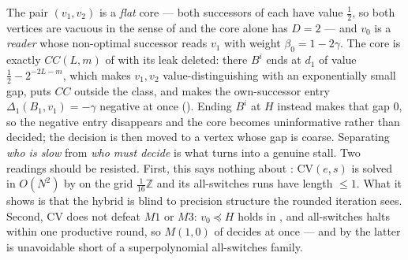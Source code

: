 \begin{remark}\label{rem:fd-cv}
The pair $(v_1,v_2)$ is a \emph{flat} core --- both successors of each have
value $\tfrac12$, so both vertices are vacuous in the sense of
 and the core alone has $D=2$ --- and $v_0$ is a
\emph{reader} whose non-optimal successor reads $v_1$ with weight
$\beta_0=1-2\gamma$. The core is exactly $CC(L,m)$ of 
with its leak deleted: there $B^{i}$ ends at $d_1$ of value
$\tfrac12-2^{-2L-m}$, which makes $v_1,v_2$ value-distinguishing with an
exponentially small gap, puts $CC$ outside the class, and makes the
own-successor entry $\Delta_1(B_1,v_1)=-\gamma$ negative at once
(). Ending $B^{i}$ at $H$ instead makes
that gap $0$, so the negative entry disappears and the core becomes
uninformative rather than decided; the decision is then moved to a vertex whose
gap is coarse. Separating \emph{who is slow} from \emph{who must decide} is
what turns  into a genuine stall. Two readings should be
resisted. First, this says nothing about :
$\mathrm{CV}(e,s)$ is solved in $O(N^{2})$ by  on the
grid $\tfrac1{16}\mathbb Z$ and its all-switches runs have length $\le1$. What
it shows is that the hybrid is blind to precision structure the rounded
iteration sees. Second, $\mathrm{CV}$ does not defeat $M1$ or $M3$:
$v_0\preceq H$ holds in , and all-switches halts within one
productive round, so $M(1,0)$ of  decides at once --- and by
 the latter is unavoidable short of a superpolynomial
all-switches family.
\end{remark}

